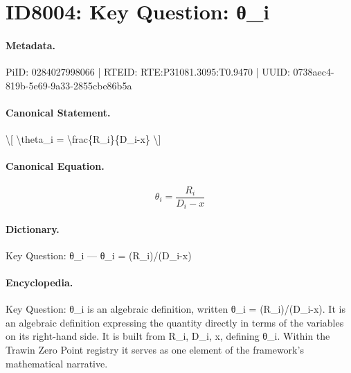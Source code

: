 \section*{ID8004: Key Question: θ\_i}
\paragraph{Metadata.}
PiID: 0284027998066 | RTEID: RTE:P31081.3095:T0.9470 | UUID: 0738aec4-819b-5e69-9a33-2855cbe86b5a

\paragraph{Canonical Statement.}
\textbackslash{}[ \textbackslash{}theta\_i = \textbackslash{}frac\{R\_i\}\{D\_i-x\} \textbackslash{}]

\paragraph{Canonical Equation.}
\[
\theta_i = \frac{R_i}{D_i-x}
\]

\paragraph{Dictionary.}
Key Question: θ\_i — θ\_i = (R\_i)/(D\_i-x)

\paragraph{Encyclopedia.}
Key Question: θ\_i is an algebraic definition, written θ\_i = (R\_i)/(D\_i-x). It is an algebraic definition expressing the quantity directly in terms of the variables on its right-hand side. It is built from R\_i, D\_i, x, defining θ\_i. Within the Trawin Zero Point registry it serves as one element of the framework's mathematical narrative.

